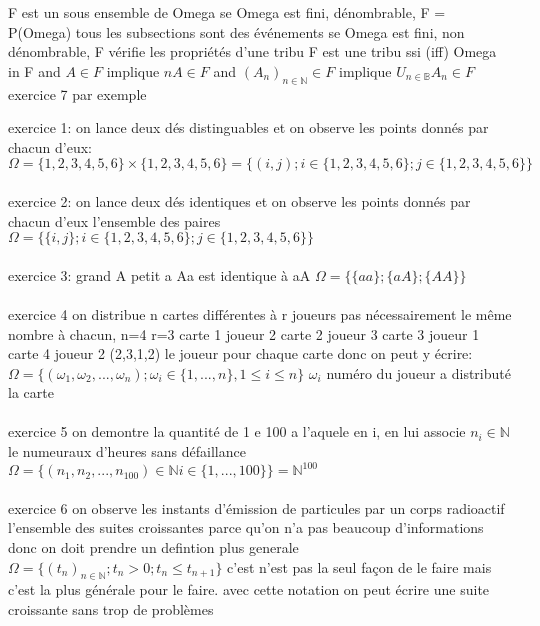 \documentclass{article}
\begin{document}
F est un sous ensemble de Omega  
se Omega est fini, dénombrable, F = P(Omega) tous les subsections sont des événements
se Omega est fini, non dénombrable, F vérifie les propriétés d'une tribu F est une tribu ssi (iff) Omega in F and $A \in F$ implique $nA \in F$ and $(A_n)_{n\in\mathbb{N}} \in F$ implique $U_{n\in\mathbb{B}}A_n \in F$ exercice 7 par exemple


exercice 1:
on lance deux dés distinguables et on observe les points donnés par chacun d'eux:
$\Omega = \{ 1,2,3,4,5,6 \} \times \{ 1,2,3,4,5,6 \} = \{ (i,j); i \in \{1,2,3,4,5,6\}; j \in \{ 1,2,3,4,5,6 \} \}$
\\\\
exercice 2:
on lance deux dés identiques et on observe les points donnés par chacun d'eux
l'ensemble des paires
$\Omega = \{ \{i,j\}; i \in \{1,2,3,4,5,6\}; j \in \{ 1,2,3,4,5,6 \} \}$
\\\\
exercice 3:
grand A petit a
Aa est identique à aA
$\Omega = \{ \{ aa \}; \{ aA \}; \{ AA \} \}$
\\\\
exercice 4
on distribue n cartes différentes à r joueurs pas nécessairement le même nombre à chacun, 
n=4 r=3
carte 1 joueur 2
carte 2 joueur 3
carte 3 joueur 1
carte 4 joueur 2
(2,3,1,2) le joueur pour chaque carte donc on peut y écrire:
$\Omega = \{ (\omega_1, \omega_2, ..., \omega_n); \omega_i \in \{ 1, ..., n \}, 1 \leq i \leq n \}$
$\omega_i$ numéro du joueur a distributé la carte
\\\\

exercice 5
on demontre la quantité de 1 e 100 a l'aquele en i, en lui associe $n_i \in \mathbb{N}$ le numeuraux d'heures sans défaillance
$\Omega = \{ (n_1, n_2, ..., n_{100}) \in \mathbb{N} i\in\{1, ..., 100\}\} = \mathbb{N}^{100}$
\\\\

exercice 6
on observe les instants d'émission de particules par un corps radioactif
l'ensemble des suites croissantes parce qu'on n'a pas beaucoup d'informations donc on doit prendre un defintion plus generale
$\Omega = \{ (t_{n})_{n \in \mathbb{N}} ; t_{n} > 0 ; t_{n} \leq t_{n+1}\}$
c'est n'est pas la seul façon de le faire mais c'est la plus générale pour le faire. avec cette notation on peut écrire une suite croissante sans trop de problèmes
\\\\
\end{document}
